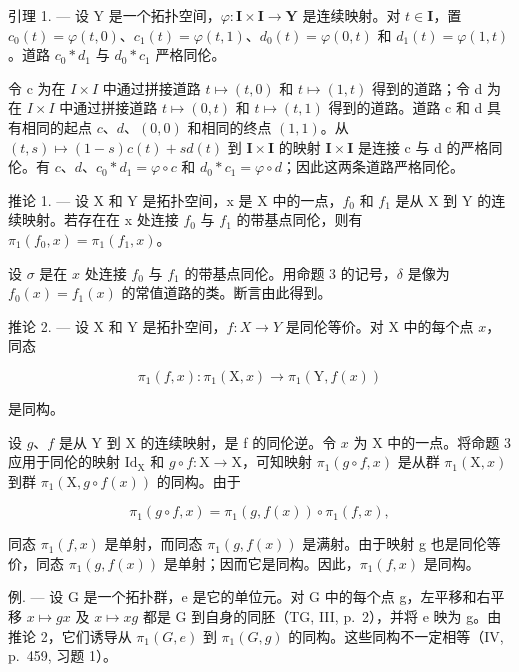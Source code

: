 引理 1. --- 设 Y 是一个拓扑空间，\(\varphi\colon\mathbf{I}\times\mathbf{I}\to\mathbf{Y}\) 是连续映射。对 \(t\in\mathbf{I}\)，置 \(c_{0}(t)=\varphi(t,0)\)、\(c_{1}(t)=\varphi(t,1)\)、\(d_{0}(t)=\varphi(0,t)\) 和 \(d_{1}(t)=\varphi(1,t)\)。道路 \(c_{0}*d_{1}\) 与 \(d_{0}*c_{1}\) 严格同伦。

令 c 为在 \(I \times I\) 中通过拼接道路 \(t \mapsto (t,0)\) 和 \(t \mapsto (1,t)\) 得到的道路；令 d 为在 \(I \times I\) 中通过拼接道路 \(t \mapsto (0, t)\) 和 \(t \mapsto (t, 1)\) 得到的道路。道路 c 和 d 具有相同的起点 \(c\)、\(d\)、\((0, 0)\) 和相同的终点 \((1, 1)\)。从 \((t, s) \mapsto (1 - s)c(t) + sd(t)\) 到 \(\mathbf{I} \times \mathbf{I}\) 的映射 \(\mathbf{I} \times \mathbf{I}\) 是连接 c 与 d 的严格同伦。有 \(c\)、\(d\)、\(c_0 * d_1 = \varphi \circ c\) 和 \(d_0 * c_1 = \varphi \circ d\)；因此这两条道路严格同伦。

推论 1. --- 设 X 和 Y 是拓扑空间，x 是 X 中的一点，\(f_0\) 和 \(f_1\) 是从 X 到 Y 的连续映射。若存在在 x 处连接 \(f_0\) 与 \(f_1\) 的带基点同伦，则有 \(\pi_1(f_0, x) = \pi_1(f_1, x)\)。

设 \(\sigma\) 是在 \(x\) 处连接 \(f_0\) 与 \(f_1\) 的带基点同伦。用命题 3 的记号，\(\delta\) 是像为 \(f_0(x) = f_1(x)\) 的常值道路的类。断言由此得到。

推论 2. --- 设 X 和 Y 是拓扑空间，\(f\colon X \to Y\) 是同伦等价。对 X 中的每个点 \(x\)，同态

\[
\pi_ {1} (f, x) \colon \pi_ {1} (\mathrm{X}, x) \to \pi_ {1} (\mathrm{Y}, f (x))
\]

是同构。

设 \(g\)、\(f\) 是从 Y 到 X 的连续映射，是 f 的同伦逆。令 \(x\) 为 X 中的一点。将命题 3 应用于同伦的映射 \(\mathrm{Id}_{\mathrm{X}}\) 和 \(g \circ f: \mathrm{X} \to \mathrm{X}\)，可知映射 \(\pi_1(g \circ f, x)\) 是从群 \(\pi_1(\mathrm{X}, x)\) 到群 \(\pi_1(\mathrm{X}, g \circ f(x))\) 的同构。由于

\[
\pi_ {1} (g \circ f, x) = \pi_ {1} (g, f (x)) \circ \pi_ {1} (f, x),
\]

同态 \(\pi_{1}(f,x)\) 是单射，而同态 \(\pi_{1}(g,f(x))\) 是满射。由于映射 g 也是同伦等价，同态 \(\pi_{1}(g,f(x))\) 是单射；因而它是同构。因此，\(\pi_{1}(f,x)\) 是同构。

例. --- 设 G 是一个拓扑群，e 是它的单位元。对 G 中的每个点 g，左平移和右平移 \(x \mapsto gx\) 及 \(x \mapsto xg\) 都是 G 到自身的同胚（TG, III, p.~2），并将 e 映为 g。由推论 2，它们诱导从 \(\pi_{1}(G, e)\) 到 \(\pi_{1}(G, g)\) 的同构。这些同构不一定相等（IV, p.~459, 习题 1）。

